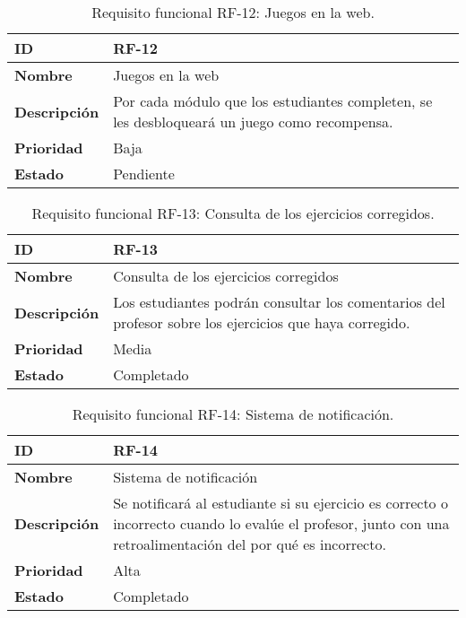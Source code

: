 \begin{table}[H]
    \centering
    \begin{tabular}{|l|p{9.5cm}|}
        \hline
        \textbf{ID} & RF-12 \\
        \hline
        \textbf{Nombre} & Juegos en la web \\
        \hline
        \textbf{Descripción} & Por cada módulo que los estudiantes completen, se les desbloqueará un juego como recompensa. \\
        \hline
        \textbf{Prioridad} & Baja \\
        \hline
        \textbf{Estado} & Pendiente \\
        \hline
    \end{tabular}
    \caption{Requisito funcional RF-12: Juegos en la web.}
    \label{table:req-RF00A}
\end{table}

\begin{table}[H]
    \centering
    \begin{tabular}{|l|p{9.5cm}|}
        \hline
        \textbf{ID} & RF-13 \\
        \hline
        \textbf{Nombre} & Consulta de los ejercicios corregidos \\
        \hline
        \textbf{Descripción} & Los estudiantes podrán consultar los comentarios del profesor sobre los ejercicios que haya corregido. \\
        \hline
        \textbf{Prioridad} & Media \\
        \hline
        \textbf{Estado} & Completado \\
        \hline
    \end{tabular}
    \caption{Requisito funcional RF-13: Consulta de los ejercicios corregidos.}
    \label{table:req-RF00B}
\end{table}

\begin{table}[H]
    \centering
    \begin{tabular}{|l|p{9.5cm}|}
        \hline
        \textbf{ID} & RF-14 \\
        \hline
        \textbf{Nombre} & Sistema de notificación \\
        \hline
        \textbf{Descripción} & Se notificará al estudiante si su ejercicio es correcto o incorrecto cuando lo evalúe el profesor, junto con una retroalimentación del por qué es incorrecto. \\
        \hline
        \textbf{Prioridad} & Alta \\
        \hline
        \textbf{Estado} & Completado \\
        \hline
    \end{tabular}
    \caption{Requisito funcional RF-14: Sistema de notificación.}
    \label{table:req-RF00C}
\end{table}

